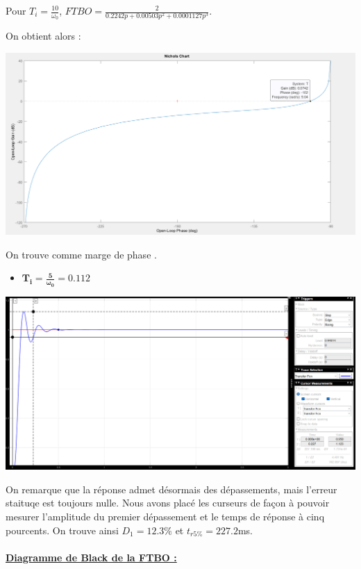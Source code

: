 \documentclass[12pt]{article}
\begin{document}
\begin{center}
    \normalsize Pour $T_i = \frac{10}{\omega_0}$, \large $FTBO = \frac{2}{0.2242p + 0.00503p^2 + 0.0001127p^3}$.
\end{center}
\newpage
\normalsize On obtient alors :
\begin{center}
    \includegraphics[width = 19 cm]{TP2 Simulink/Syst_2/nichols_Ti=10_sur_omega0.png}
\end{center}
On trouve comme marge de phase .
\newpage
\begin{itemize}
    \item \large $\mathbf{T_i = \frac{5}{\omega_0} = 0.112}$
\end{itemize}
\begin{center}
    \includegraphics[width = 19 cm]{TP2 Simulink/Syst_2/tr5prct_et_depassement_4.2_5_sur_omega0.png}

\end{center}
On remarque que la réponse admet désormais des dépassements, mais l'erreur staituqe est toujours nulle. Nous avons placé les curseurs de façon à pouvoir mesurer l'amplitude du premier dépassement et le temps de réponse à cinq pourcents.
On trouve ainsi $D_1 = 12.3\%$ et $t_{r5\%} = 227.2$ms.
\\\\\underline{\bf Diagramme de Black de la FTBO :}
\end{document}
